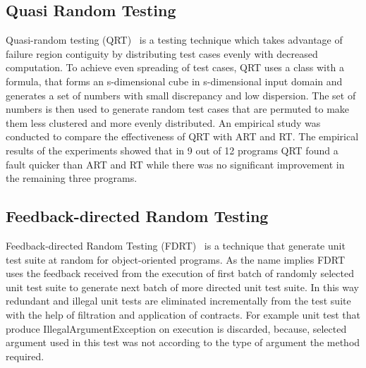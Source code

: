 {\subsection{Quasi Random Testing}
Quasi-random testing (QRT)~\cite{Chen2005} is a testing technique which takes advantage of failure region contiguity by distributing test cases evenly with decreased computation. %
To achieve even spreading of test cases, QRT uses a class with a formula, that forms an s-dimensional cube in s-dimensional input domain and generates a set of numbers with small discrepancy and low dispersion. The set of numbers is then used to generate random test cases that are permuted to make them less clustered and more evenly distributed. An empirical study was conducted to compare the effectiveness of QRT with ART and RT. The empirical results of the experiments showed that in 9 out of 12 programs QRT found a fault quicker than ART and RT while there was no significant improvement in the remaining three programs.


\subsection{Feedback-directed Random Testing}
Feedback-directed Random Testing (FDRT)~\cite{Pacheco2007} is a technique that generate unit test suite at random for object-oriented programs. As the name implies FDRT uses the feedback received from the execution of first batch of randomly selected unit test suite to generate next batch of more directed unit test suite. In this way redundant and illegal unit tests are eliminated incrementally from the test suite with the help of filtration and application of contracts. For example unit test that produce IllegalArgumentException on execution is discarded, because, selected argument used in this test was not according to the type of argument the method required. 

}
